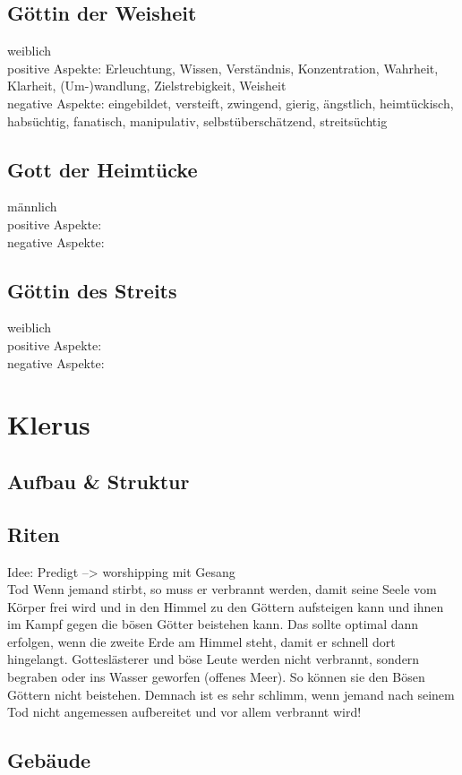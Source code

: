 \subsection{Göttin der Weisheit}
weiblich\\
positive Aspekte: Erleuchtung, Wissen, Verständnis, Konzentration, Wahrheit, Klarheit, (Um-)wandlung, Zielstrebigkeit, Weisheit\\
negative Aspekte: eingebildet, versteift, zwingend, gierig, ängstlich, heimtückisch, habsüchtig, fanatisch, manipulativ, selbstüberschätzend, streitsüchtig
\subsection{Gott der Heimtücke}
männlich\\
positive Aspekte: \\
negative Aspekte: 
\subsection{Göttin des Streits}
weiblich\\
positive Aspekte: \\
negative Aspekte: 

\section{Klerus}
\subsection{Aufbau \& Struktur}

\subsection{Riten}
Idee: Predigt --> worshipping mit Gesang\\ Tod
Wenn jemand stirbt, so muss er verbrannt werden, damit seine Seele vom Körper frei wird und in den Himmel zu den Göttern aufsteigen kann und ihnen im Kampf gegen die bösen Götter beistehen kann. Das sollte optimal dann erfolgen, wenn die zweite Erde am Himmel steht, damit er schnell dort hingelangt. 
Gotteslästerer und böse Leute werden nicht verbrannt, sondern begraben oder ins Wasser geworfen (offenes Meer). So können sie den Bösen Göttern nicht beistehen.
Demnach ist es sehr schlimm, wenn jemand nach seinem Tod nicht angemessen aufbereitet und vor allem verbrannt wird!

\subsection{Gebäude}
